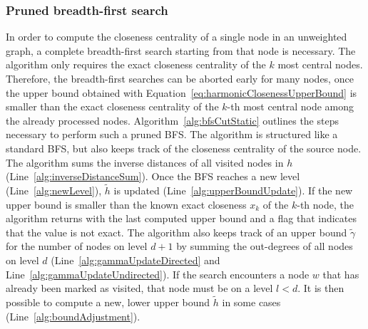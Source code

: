 \subsubsection{Pruned breadth-first search}
In order to compute the closeness centrality of a single node in an unweighted graph, a complete breadth-first search starting from that node is necessary. The algorithm only requires the exact closeness centrality of the $k$ most central nodes. Therefore, the breadth-first searches can be aborted early for many nodes, once the upper bound obtained with Equation~\ref{eq:harmonicClosenessUpperBound} is smaller than the exact closeness centrality of the $k$-th most central node among the already processed nodes. Algorithm~\ref{alg:bfsCutStatic} outlines the steps necessary to perform such a pruned BFS. The algorithm is structured like a standard BFS, but also keeps track of the closeness centrality of the source node. The algorithm sums the inverse distances of all visited nodes in $h$ (Line~\ref{alg:inverseDistanceSum}). Once the BFS reaches a new level (Line~\ref{alg:newLevel}), $\widetilde{h}$ is updated (Line~\ref{alg:upperBoundUpdate}). If the new upper bound is smaller than the known exact closeness $x_k$ of the $k$-th node, the algorithm returns with the last computed upper bound and a flag that indicates that the value is not exact. The algorithm also keeps track of an upper bound $\widetilde{\gamma}$ for the number of nodes on level $d + 1$ by summing the out-degrees of all nodes on level $d$ (Line~\ref{alg:gammaUpdateDirected} and Line~\ref{alg:gammaUpdateUndirected}). If the search encounters a node $w$ that has already been marked as visited, that node must be on a level $l < d$. It is then possible to compute a new, lower upper bound $\widetilde{h}$ in some cases (Line~\ref{alg:boundAdjustment}).

